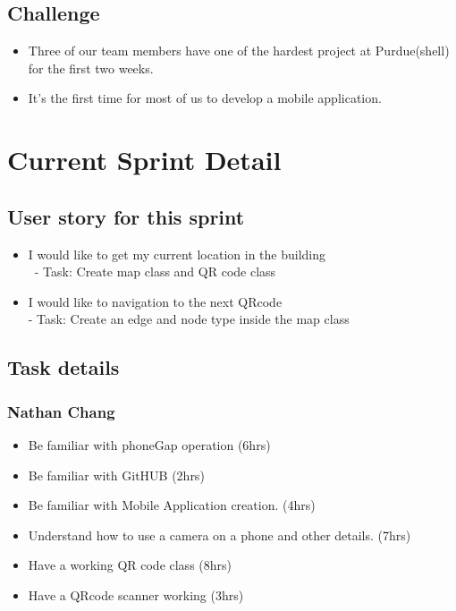\documentclass[12pt]{article}
\begin{document}
\subsection{Challenge}

\begin{itemize}
\item Three of our team members have one of the hardest project at Purdue(shell) for the first two weeks.
\item It's the first time for most of us to develop a mobile application.
\end{itemize}

\section{Current Sprint Detail}

\subsection{User story for this sprint}

\begin{itemize}
\item I would like to get my current location in the building \\ \ - Task: Create map class and QR code class

\item I would like to navigation to the next QRcode \\ - Task: Create an edge and node type inside the map class

\end{itemize}

\subsection{Task details}
\subsubsection*{Nathan Chang}
\begin{itemize}
\item Be familiar with phoneGap operation (6hrs)
\item Be familiar with GitHUB (2hrs)
\item Be familiar with Mobile Application creation. (4hrs)
\item Understand how to use a camera on a phone and other details. (7hrs)
\item Have a working QR code class (8hrs)
\item Have a QRcode scanner working   (3hrs)
\end{itemize}
\end{document}
